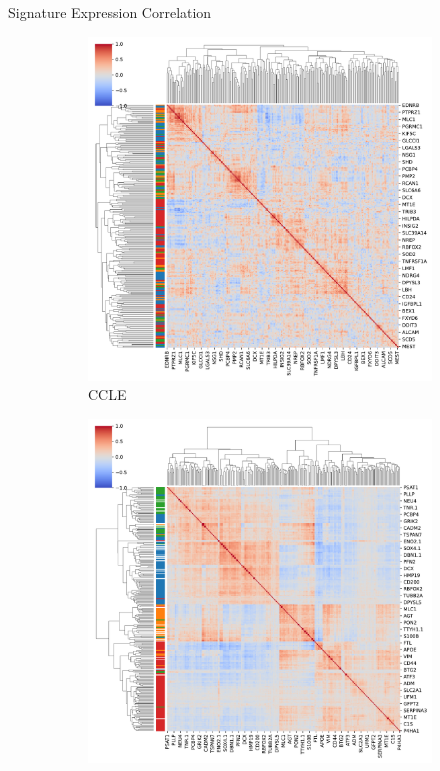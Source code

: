 \documentclass[aspectratio=169,9pt]{beamer}
\begin{document}
    \begin{frame}{Signature Expression Correlation}
        \begin{adjustwidth}{-5cm}{-5cm}
            \centering
            \begin{figure}
                \centering
                \begin{subfigure}[b]{0.38\textwidth}
                    \centering
                    \includegraphics[width=\textwidth]{CCLE_Corrplot_coloured}
                    \caption{CCLE}
                \end{subfigure}
                \begin{subfigure}[b]{0.38\textwidth}
                    \centering
                    \includegraphics[width=\textwidth]{GSM3828672_Corrplot_coloured}

\end{subfigure}
\end{figure}
\end{adjustwidth}
\end{frame}
\end{document}

